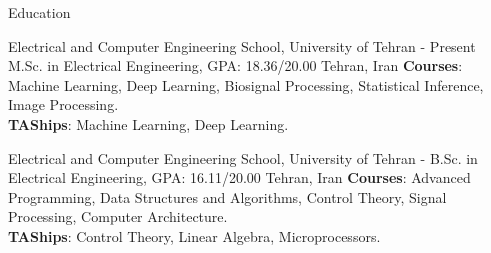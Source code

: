 \documentclass[../professional-cv.tex]{subfiles}
\begin{document}
	\begin{rSection}{ Education }
		
		
		\rEducationHeading
		{Electrical and Computer Engineering School, \nem University of Tehran}
		{  - Present }
		{\normalfont M.Sc. in Electrical Engineering, GPA: 18.36/20.00}
		{Tehran, Iran}
		{
			{\bfseries Courses}: Machine Learning, Deep Learning, Biosignal Processing, Statistical Inference, Image Processing.
			\\
			{\bfseries TAShips}: Machine Learning, Deep Learning. \smallskip
		}
	
		\rEducationHeading
		{Electrical and Computer Engineering School, \nem University of Tehran}
		{  -  }
		{\normalfont B.Sc. in Electrical Engineering, GPA: 16.11/20.00}
		{Tehran, Iran}
		{
			{\bfseries Courses}: Advanced Programming, Data Structures and Algorithms, Control Theory, Signal Processing, Computer Architecture.
			\\
			{\bfseries TAShips}: Control Theory, Linear Algebra, Microprocessors. \smallskip
		}
		
		
	\end{rSection}
\end{document}
